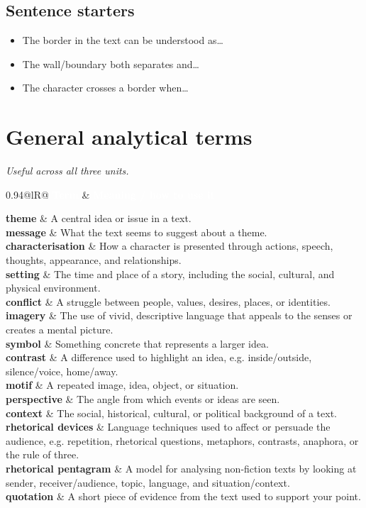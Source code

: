 \documentclass[10pt,a4paper]{article}
\makeatletter
\newcommand{\termrow}[2]{\textbf{#1} & #2 \\}
\newcommand{\termrowshaded}[2]{\rowcolor{rowgrey}\textbf{#1} & #2 \\}
\newcommand{\termtable}[1]{%
		\begin{center}
		\begin{tabularx}{0.94\textwidth}{@{}lR@{}}
		\toprule
		\rowcolor{frbgreen}\textcolor{white}{\textbf{Term}} & \textcolor{white}{\textbf{Meaning / how to use it}} \\
		\midrule
		#1
		\bottomrule
		\end{tabularx}
		\end{center}%
	}
\makeatother
\begin{document}
\subsection*{Sentence starters}

\begin{itemize}
	\item The border in the text can be understood as\ldots
	\item The wall/boundary both separates and\ldots
	\item The character crosses a border when\ldots
\end{itemize}

\newpage
\section{General analytical terms}

\noindent\textit{Useful across all three units.}

\vspace{0.5em}

\termtable{
\termrow{theme}{A central idea or issue in a text.}
\termrowshaded{message}{What the text seems to suggest about a theme.}
\termrow{characterisation}{How a character is presented through actions, speech, thoughts, appearance, and relationships.}
\termrowshaded{setting}{The time and place of a story, including the social, cultural, and physical environment.}
\termrow{conflict}{A struggle between people, values, desires, places, or identities.}
\termrowshaded{imagery}{The use of vivid, descriptive language that appeals to the senses or creates a mental picture.}
\termrow{symbol}{Something concrete that represents a larger idea.}
\termrowshaded{contrast}{A difference used to highlight an idea, e.g. inside/outside, silence/voice, home/away.}
\termrow{motif}{A repeated image, idea, object, or situation.}
\termrowshaded{perspective}{The angle from which events or ideas are seen.}
\termrow{context}{The social, historical, cultural, or political background of a text.}
\termrowshaded{rhetorical devices}{Language techniques used to affect or persuade the audience, e.g. repetition, rhetorical questions, metaphors, contrasts, anaphora, or the rule of three.}
\termrow{rhetorical pentagram}{A model for analysing non-fiction texts by looking at sender, receiver/audience, topic, language, and situation/context.}
\termrowshaded{quotation}{A short piece of evidence from the text used to support your point.}
}
\end{document}
